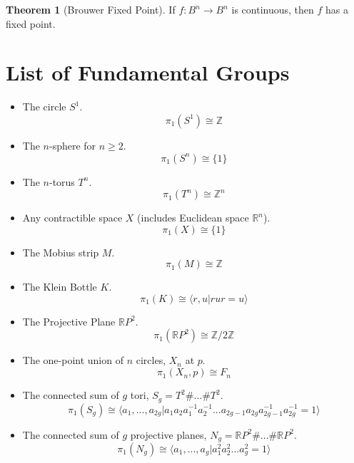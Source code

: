 \documentclass[11pt, oneside]{amsart}   	%
\theoremstyle{definition}
\newtheorem{theorem}{Theorem}[section]
\begin{document}
	\begin{theorem}[Brouwer Fixed Point]
		If $f : B^n\rightarrow B^n$ is continuous, then $f$ has a fixed point.
	\end{theorem}

\newpage

\section{List of Fundamental Groups}

\begin{itemize}
	\item The circle $S^1$. 
	$$
		\pi_1(S^1)\cong\mathbb Z
	$$
	
	\item The $n$-sphere for $n\geq 2$.
	$$
		\pi_1(S^n)\cong\{1\}
	$$
	
	\item The $n$-torus $T^n$. 
	$$
		\pi_1(T^n)\cong\mathbb Z^n
	$$
	
	\item Any contractible space $X$ (includes Euclidean space $\mathbb R^n$).
	$$
		\pi_1(X)\cong\{1\}
	$$
	
	\item The Mobius strip $M$. 
	$$
		\pi_1(M)\cong\mathbb Z
	$$
	
	\item The Klein Bottle $K$.
	$$
		\pi_1(K)\cong\langle r, u | rur = u\rangle
	$$
	
	\item The Projective Plane $\mathbb RP^2$.
	$$
		\pi_1(\mathbb RP^2)\cong\mathbb Z / 2\mathbb Z
	$$
	
	\item The one-point union of $n$ circles, $X_n$ at $p$.
	$$
		\pi_1(X_n, p)\cong F_n
	$$
	
	\item The connected sum of $g$ tori, $S_g = T^2\# ...\# T^2$.
	$$
		\pi_1(S_g)\cong\langle a_1, ..., a_{2g} | a_1a_2a_1^{-1}a_2^{-1}...a_{2g - 1}a_{2g}a_{2g-1}^{-1}a_{2g}^{-1} = 1\rangle
	$$
	
	\item The connected sum of $g$ projective planes, $N_g = \mathbb RP^2\# ...\#\mathbb RP^2$.
	$$
		\pi_1(N_g)\cong\langle a_1, ..., a_g | a_1^2a_2^2...a_g^2 = 1\rangle
	$$
	
\end{itemize}
\end{document}

